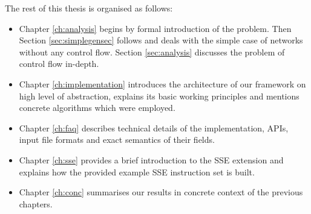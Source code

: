 The rest of this thesis is organised as follows:
\begin{itemize}
  \item Chapter \ref{ch:analysis} begins by formal introduction of the problem. Then Section \ref{sec:simplegensec} follows and deals with the simple case of networks without any control flow. Section \ref{sec:analysis} discusses the problem of control flow in-depth.
  \item Chapter \ref{ch:implementation} introduces the architecture of our framework on high level of abstraction, explains its basic working principles and mentions concrete algorithms which were employed.
  \item Chapter \ref{ch:faq} describes technical details of the implementation, APIs, input file formats and exact semantics of their fields.
  \item Chapter \ref{ch:sse} provides a brief introduction to the SSE extension and explains how the provided example SSE instruction set is built.
  \item Chapter \ref{ch:conc} summarises our results in concrete context of the previous chapters.
\end{itemize}



